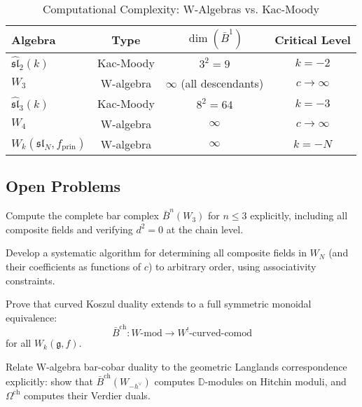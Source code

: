 \begin{table}[h]
\centering
\caption{Computational Complexity: W-Algebras vs. Kac-Moody}
\begin{tabular}{|l|c|c|c|}
\hline
\textbf{Algebra} & \textbf{Type} & $\dim(\bar{B}^1)$ & \textbf{Critical Level} \\
\hline
$\widehat{\mathfrak{sl}}_2(k)$ & Kac-Moody & $3^2 = 9$ & $k = -2$ \\
$W_3$ & W-algebra & $\infty$ (all descendants) & $c \to \infty$ \\
$\widehat{\mathfrak{sl}}_3(k)$ & Kac-Moody & $8^2 = 64$ & $k = -3$ \\
$W_4$ & W-algebra & $\infty$ & $c \to \infty$ \\
$W_k(\mathfrak{sl}_N, f_{\text{prin}})$ & W-algebra & $\infty$ & $k = -N$ \\
\hline
\end{tabular}
\end{table}

\subsection{Open Problems}

\begin{openproblem}[1]
Compute the complete bar complex $\bar{B}^n(W_3)$ for $n \le 3$ explicitly, including all composite fields and verifying $d^2 = 0$ at the chain level.
\end{openproblem}

\begin{openproblem}[2]
Develop a systematic algorithm for determining all composite fields in $W_N$ (and their coefficients as functions of $c$) to arbitrary order, using associativity constraints.
\end{openproblem}

\begin{openproblem}[3]
Prove that curved Koszul duality extends to a full symmetric monoidal equivalence:
$$\bar{B}^{\text{ch}}: W\text{-mod} \to W^!\text{-curved-comod}$$
for all $W_k(\mathfrak{g}, f)$.
\end{openproblem}

\begin{openproblem}[4]
Relate W-algebra bar-cobar duality to the geometric Langlands correspondence explicitly: show that $\bar{B}^{\text{ch}}(W_{-h^\vee})$ computes $\mathbb{D}$-modules on Hitchin moduli, and $\Omega^{\text{ch}}$ computes their Verdier duals.
\end{openproblem}

